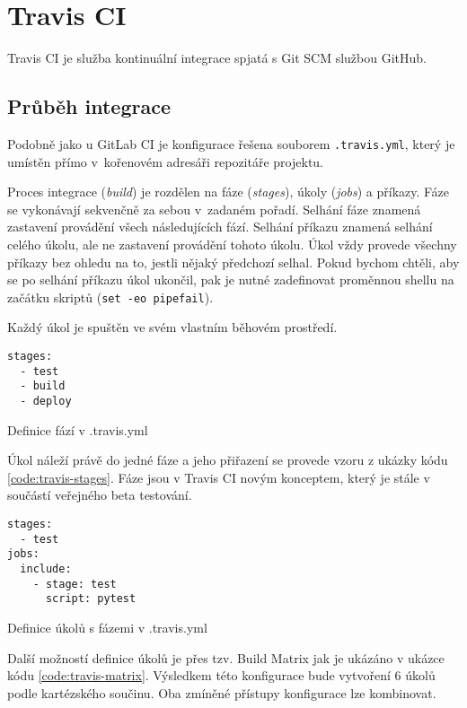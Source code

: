 \chapter{Travis CI}

Travis CI je služba kontinuální integrace spjatá s Git SCM službou GitHub.

\section{Průběh integrace}

Podobně jako u GitLab CI je konfigurace řešena souborem \verb|.travis.yml|, který je umístěn přímo v~kořenovém adresáři repozitáře projektu.

Proces integrace (\textit{build}) je rozdělen na fáze (\textit{stages}), úkoly (\textit{jobs}) a příkazy.
Fáze se vykonávají sekvenčně za sebou v~zadaném pořadí.
Selhání fáze znamená zastavení provádění všech následujících fází.
Selhání příkazu znamená selhání celého úkolu, ale ne zastavení provádění tohoto úkolu.
Úkol vždy provede všechny příkazy bez ohledu na to, jestli nějaký předchozí selhal. 
Pokud bychom chtěli, aby se po selhání příkazu úkol ukončil, pak je nutné zadefinovat proměnnou shellu na začátku skriptů (\verb|set -eo pipefail|).

Každý úkol je spuštěn ve svém vlastním běhovém prostředí.

\begin{listing}[ht]
\begin{verbatim}
stages:
  - test
  - build
  - deploy
\end{verbatim}
\caption{Definice fází v .travis.yml}
\end{listing}

Úkol náleží právě do jedné fáze a jeho přiřazení se provede vzoru z ukázky kódu \ref{code:travis-stages}.
Fáze jsou v Travis CI novým konceptem, který je stále v součástí veřejného beta testování.

\begin{listing}[ht]
\begin{verbatim}
stages:
  - test
jobs:
  include:
    - stage: test
      script: pytest

\end{verbatim}
\label{code:travis-stages}
\caption{Definice úkolů s fázemi v .travis.yml}
\end{listing}

Další možností definice úkolů je přes tzv. Build Matrix jak je ukázáno v ukázce kódu \ref{code:travis-matrix}.
Výsledkem této konfigurace bude vytvoření 6 úkolů podle kartézského součinu.
Oba zmíněné přístupy konfigurace lze kombinovat.

